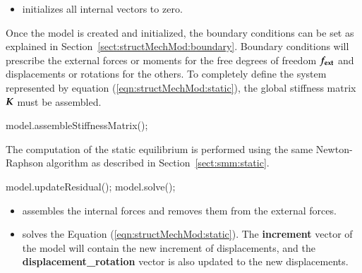 \begin{itemize}
\item {} initializes all internal vectors to zero.
\end{itemize}


Once the model is created and initialized, the boundary conditions can
be set as explained in Section~\ref{sect:structMechMod:boundary}.
Boundary conditions will prescribe the external forces or moments for
the free degrees of freedom $\boldsymbol{f_{{\mathrm{ext}}}}$ and displacements or
rotations for the others.  To completely define the system represented
by equation (\ref{eqn:structMechMod:static}), the global stiffness
matrix $\boldsymbol{K}$ must be assembled.

\begin{cpp}
  model.assembleStiffnessMatrix();
\end{cpp}

The computation of the static equilibrium is performed using the same
Newton-Raphson algorithm as described in
Section~\ref{sect:smm:static}.


\begin{cpp}
  model.updateResidual();
  model.solve();
\end{cpp}

\begin{itemize}

\item {} assembles the internal forces and
  removes them from the external forces.
\item {} solves the Equation (\ref{eqn:structMechMod:static}).
  The \textbf{increment} vector of the model will contain the new
  increment of displacements, and the \textbf{displacement\_rotation}
  vector is also updated to the new displacements.

\end{itemize}


